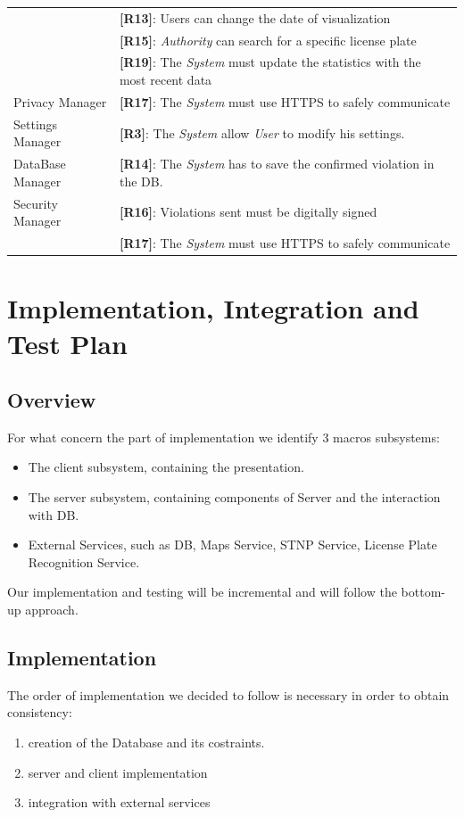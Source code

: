 \documentclass{article}
\begin{document}
\begin{center}
\begin{tabular}{ | l | l |}
                           & \textbf{[R13]}: Users can change the date of visualization \\
                           & \textbf{[R15]}: \textit{Authority} can search for a specific license plate \\
                           & \textbf{[R19]}: The \textit{System} must update the statistics with the most recent data \\
        \hline
        Privacy Manager & \textbf{[R17]}: The \textit{System} must use HTTPS to safely communicate \\
        \hline 
        Settings Manager & \textbf{[R3]}: The \textit{System} allow \textit{User} to modify his settings. \\
        \hline
        DataBase Manager & \textbf{[R14]}: The \textit{System} has to save the confirmed violation in the DB. \\
        \hline
        Security Manager & \textbf{[R16]}: Violations sent must be digitally signed \\
                         & \textbf{[R17]}: The \textit{System} must use HTTPS to safely communicate \\
        \hline
    \end{tabular}
    \end{center}
\clearpage
\section{Implementation, Integration and Test Plan}
\subsection{Overview}
For what concern the part of implementation we identify 3 macros subsystems:
\begin{itemize}
    \item The client subsystem, containing the presentation.
    \item The server subsystem, containing components of Server and the interaction with DB.
    \item External Services, such as DB, Maps Service, STNP Service, License Plate Recognition Service. 
\end{itemize}  
Our implementation and testing will be incremental and will follow the bottom-up approach.

\subsection{Implementation}
The order of implementation we decided to follow is necessary in order to obtain consistency:
\begin{enumerate}
    \item creation of the Database and its costraints.
    \item server and client implementation
    \item integration with external services
\end{enumerate}
\end{document}
